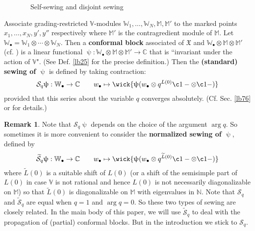 \documentclass[11pt,b5paper,notitlepage]{article}
\theoremstyle{definition}
\newtheorem{rem}[df]{Remark}
\theoremstyle{plain}
\newcommand{\mc}{\mathcal}
\newcommand{\wtd}{\widetilde}
\newcommand{\blt}{\bullet}
\newcommand{\Vbb}{\mathbb V}
\newcommand{\Wbb}{\mathbb W}
\newcommand{\Mbb}{\mathbb M}
\newcommand{\Cbb}{\mathbb C}
\newcommand{\Nbb}{\mathbb N}
\newcommand{\<}{\left\langle}
\renewcommand{\>}{\right\rangle}
\newcommand{\fx}{\mathfrak{X}}
\numberwithin{equation}{subsection}
\begin{document}
\begin{figure}[h]
{


}
	\caption{~~Self-sewing and disjoint sewing}
	\label{fig2}
\end{figure}

Associate grading-restricted $\Vbb$-modules $\Wbb_1,\dots,\Wbb_N,\Mbb,\Mbb'$ to the marked points $x_1,\dots,x_N,y',y''$ respectively where $\Mbb'$ is the contragredient module of $\Mbb$. Let $\Wbb_\blt=\Wbb_1\otimes\cdots\otimes\Wbb_N$. Then a \textbf{conformal block} associated of $\fx$ and $\Wbb_\blt\otimes\Mbb\otimes\Mbb'$ (cf. \cite{Zhu-global,FB04}) is a linear functional $\uppsi:\Wbb_\blt\otimes\Mbb\otimes\Mbb'\rightarrow\Cbb$ that is ``invariant under the action of $\Vbb$". (See Def. \ref{lb25} for the precise definition.) Then the \textbf{(standard) sewing of $\uppsi$} is defined by taking contraction:
\begin{gather}
\mc S_q\uppsi:\Wbb_\blt\rightarrow\Cbb\qquad w_\blt\mapsto \wick{\uppsi(w_\blt\otimes q^{L(0)}\c1-\otimes \c1-)}
\end{gather}
provided that this series about the variable $q$ converges absolutely. (Cf. Sec. \ref{lb76} or \cite[Sec. 10]{Gui-sewingconvergence} for details.)

\begin{rem}
Note that $\mc S_q\uppsi$ depends on the choice of the argument $\arg q$. So sometimes it is more convenient to consider the \textbf{normalized sewing of $\uppsi$}, defined by
\begin{gather}
\wtd{\mc S}_q\uppsi:\Wbb_\blt\rightarrow\Cbb\qquad w_\blt\mapsto \wick{\uppsi(w_\blt\otimes q^{\wtd L(0)}\c1-\otimes \c1-)}
\end{gather}
where $\wtd L(0)$ is a suitable shift of $L(0)$ (or a shift of the semisimple part of $L(0)$ in case $\Vbb$ is not rational and hence $L(0)$ is not necessarily diagonalizable on $\Mbb$) so that $\wtd L(0)$ is diagonalizable on $\Mbb$ with eigenvalues in $\Nbb$. Note that $\mc S_q$ and $\wtd{\mc S}_q$ are equal when $q=1$ and $\arg q=0$. So these two types of sewing are closely related. In the main body of this paper, we will use $\wtd{\mc S}_q$ to deal with the propagation of (partial) conformal blocks. But in the introduction we stick to $\mc S_q$.
\end{rem}
\end{document}
